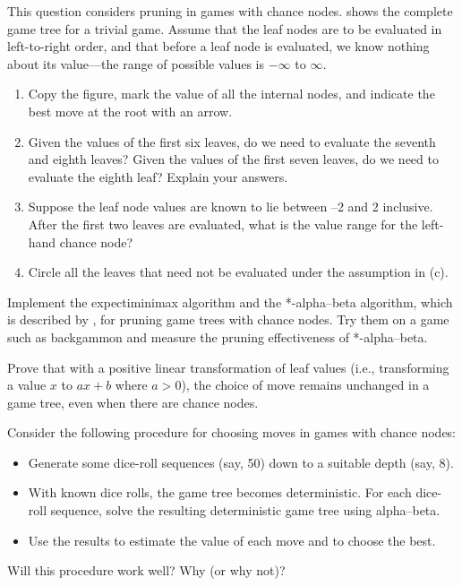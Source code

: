 \begin{exercise}%
This question considers pruning in games with chance nodes.
 shows the complete game tree for a trivial game. Assume that the leaf 
nodes are to be evaluated in left-to-right order, and that before a leaf node is evaluated, 
we know nothing about its value---the range of possible values is \(-\infty\)
to \(\infty\).
\begin{enumerate}
\item Copy the figure, mark the value of all the internal nodes, and indicate the best move at the root
with an arrow.
\item Given the values of the first six leaves, do we need to evaluate the seventh and eighth leaves?
Given the values of the first seven leaves, do we need to evaluate the eighth leaf? Explain your answers.
\item Suppose the leaf node values are known to lie between --2 and 2 inclusive.
After  the first two leaves are evaluated, what is the value range for the left-hand chance node?
\item Circle all the leaves that need not be evaluated under the assumption in (c).
\end{enumerate}
\end{exercise} 

\begin{exercise}\prgex%
Implement the expectiminimax algorithm and the *-alpha--beta
algorithm, which is described by , for pruning game
trees with chance nodes. Try them on a game such as backgammon and
measure the pruning effectiveness of *-alpha--beta.\libex
\end{exercise} 

\begin{exercise}
  Prove that with a positive linear transformation of leaf values
  (i.e., transforming a value \(x\) to \(ax + b\) where \(a > 0\)),
  the choice of move remains unchanged in a game tree, even when there
  are chance nodes.
\end{exercise} 

\begin{exercise}%
Consider the following procedure for choosing moves in
games with chance nodes: 
\begin{itemize}
\item Generate some dice-roll sequences (say, 50) down to
a suitable depth (say, 8).
\item With known dice rolls, the game tree becomes deterministic. For
each dice-roll sequence, solve the resulting deterministic game tree
using alpha--beta.
\item Use the results to estimate the value of each move and to choose
the best.
\end{itemize}
Will this procedure work well? Why (or why not)?
\end{exercise} 

